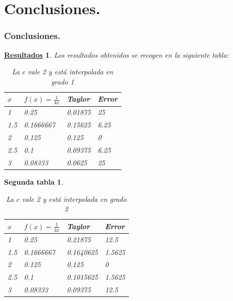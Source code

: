 \documentclass{beamer}
\newtheorem{descripcion de los experimentos}{\underline {Descripcion de los experimentos}}
\newtheorem{resultados}{\underline {Resultados}}
\newtheorem{hola}{Segunda tabla}
\begin{document}
\section{Conclusiones.}
\begin{frame}
\frametitle{Conclusiones.}
\begin{resultados}
Los resultados obtenidos se recogen en la siguiente tabla:

\begin{table}[!hbt]
\begin{center}
\begin{tabular}[c]{||l | l ||l|l||}
\hline
\hline
$x$ & $f(x)=\frac{1}{4x}$ &{\em Taylor} & Error \\
\hline
1 &0.25& 0.01875 & 25\\
\hline
1.5 &0.1666667&0.15625& 6.25\\
\hline
2 &0.125 &0.125 & 0 \\
\hline
2.5 &0.1 &0.09375 & 6.25 \\
\hline
3 & 0.08333 & 0.0625 & 25 \\
\hline
\hline
\end{tabular}
\caption{La $c$ vale 2 y está interpolada en grado 1}
\end{center}
\end{table}
\end{resultados}
\end{frame}


\begin{frame}
\begin{hola}
\begin{table}[!hbt]
\begin{center}
\begin{tabular}[c]{||l | l ||l|l||}
\hline
\hline
$x$ & $f(x)=\frac{1}{4x}$ &{\em Taylor} & Error \\
\hline
1 &0.25 & 0.21875 &12.5 \\
\hline
1.5 &0.1666667 & 0.1640625& 1.5625 \\
\hline
2 &0.125 &0.125 & 0 \\
\hline
2.5 &0.1 &0.1015625 & 1.5625 \\
\hline
3 & 0.08333 & 0.09375& 12.5 \\
\hline
\hline
\end{tabular}
\caption{La $c$ vale 2 y está interpolada en grado 2}
\end{center}
\end{table}
\end{hola}
\end{frame}
\end{document}
